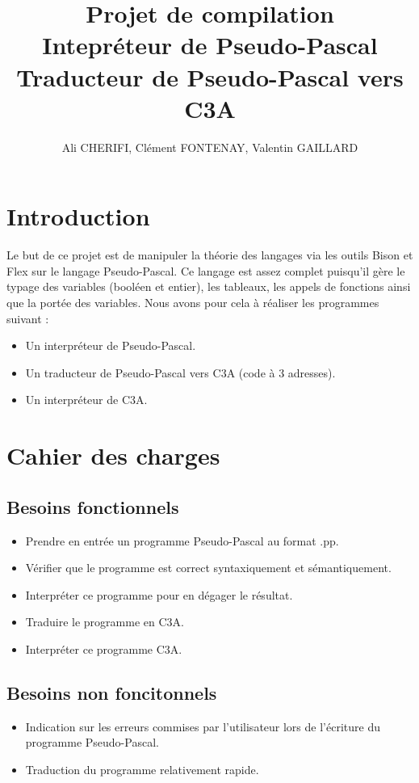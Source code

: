 ﻿\documentclass[10pt,a4paper]{article}
\author{Ali CHERIFI, Clément FONTENAY, Valentin GAILLARD}
\title{Projet de compilation\\Intepréteur de Pseudo-Pascal \\Traducteur de Pseudo-Pascal vers C3A}
\begin{document}
\maketitle
\newpage
\tableofcontents
\newpage
\section{Introduction}

Le but de ce projet est de manipuler la théorie des langages via les outils Bison et Flex sur le langage Pseudo-Pascal.
Ce langage est assez complet puisqu'il gère le typage des variables (booléen et entier), les tableaux, les appels de fonctions ainsi que la portée des variables.
Nous avons pour cela à réaliser les programmes suivant :\\ 
\begin{itemize}
    \item Un interpréteur de Pseudo-Pascal.
    \item Un traducteur de Pseudo-Pascal vers C3A (code à 3 adresses).
    \item Un interpréteur de C3A.
\end{itemize}

\section{Cahier des charges}
\subsection{Besoins fonctionnels}

\begin{itemize}
    \item Prendre en entrée un programme Pseudo-Pascal au format .pp.
    \item Vérifier que le programme est correct syntaxiquement et sémantiquement.
    \item Interpréter ce programme pour en dégager le résultat.
    \item Traduire le programme en C3A.
    \item Interpréter ce programme C3A.
\end{itemize}

\subsection{Besoins non foncitonnels}

\begin{itemize}
    \item Indication sur les erreurs commises par l'utilisateur lors de l'écriture du programme Pseudo-Pascal.
    \item Traduction du programme relativement rapide.\\
\end{itemize}
\end{document}
